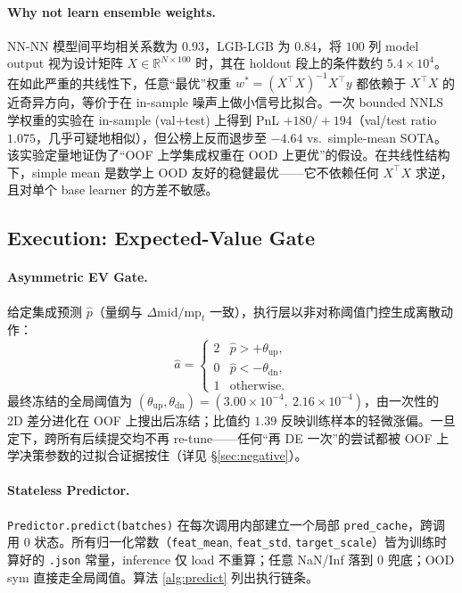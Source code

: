 \documentclass[11pt]{article}
\begin{document}
\paragraph{Why not learn ensemble weights.}
NN-NN 模型间平均相关系数为 $0.93$，LGB-LGB 为 $0.84$，将 $100$ 列 model output 视为设计矩阵 $X\in\mathbb{R}^{N\times100}$ 时，其在 holdout 段上的条件数约 $5.4\!\times\!10^{4}$。在如此严重的共线性下，任意``最优''权重 $w^* = (X^\top X)^{-1} X^\top y$ 都依赖于 $X^\top X$ 的近奇异方向，等价于在 in-sample 噪声上做小信号比拟合。一次 bounded NNLS 学权重的实验在 in-sample (val+test) 上得到 PnL $+180/+194$（val/test ratio $1.075$，几乎可疑地相似），但公榜上反而退步至 $-4.64$ vs.\ simple-mean SOTA。该实验定量地证伪了``OOF 上学集成权重在 OOD 上更优''的假设。在共线性结构下，simple mean 是数学上 OOD 友好的稳健最优——它不依赖任何 $X^\top X$ 求逆，且对单个 base learner 的方差不敏感。

\subsection{Execution: Expected-Value Gate}
\label{sec:exec}

\paragraph{Asymmetric EV Gate.}
给定集成预测 $\hat p$（量纲与 $\Delta\mathrm{mid}/\mathrm{mp}_t$ 一致），执行层以非对称阈值门控生成离散动作：
\begin{equation}
\label{eq:evgate}
\hat a =
\begin{cases}
2 & \hat p > +\theta_{\text{up}},\\
0 & \hat p < -\theta_{\text{dn}},\\
1 & \text{otherwise}.
\end{cases}
\end{equation}
最终冻结的全局阈值为 $(\theta_{\text{up}}, \theta_{\text{dn}}) = (3.00\!\times\!10^{-4},\ 2.16\!\times\!10^{-4})$，由一次性的 2D 差分进化在 OOF 上搜出后冻结；比值约 $1.39$ 反映训练样本的轻微涨偏。一旦定下，跨所有后续提交均不再 re-tune——任何``再 DE 一次''的尝试都被 OOF 上学决策参数的过拟合证据按住（详见 \S\ref{sec:negative}）。

\paragraph{Stateless Predictor.}
\texttt{Predictor.predict(batches)} 在每次调用内部建立一个局部 \texttt{pred\_cache}，跨调用 0 状态。所有归一化常数（\texttt{feat\_mean}, \texttt{feat\_std}, \texttt{target\_scale}）皆为训练时算好的 \texttt{.json} 常量，inference 仅 load 不重算；任意 NaN/Inf 落到 $0$ 兜底；OOD sym 直接走全局阈值。算法 \ref{alg:predict} 列出执行链条。
\end{document}
